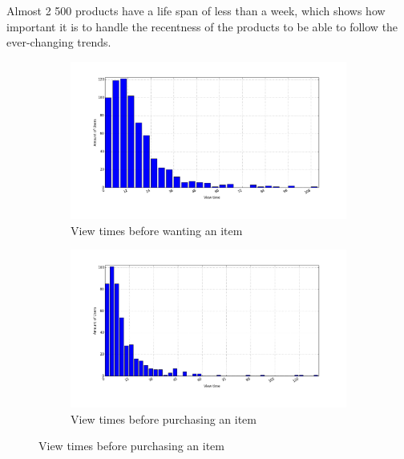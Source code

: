         Almost 2 500 products have a life span of less than a week, which shows how important it is to handle the recentness of the products to be able to follow the ever-changing trends.

    \begin{figure}[H]
        \centering
        \begin{subfigure}{.5\textwidth}
            \centering
            \includegraphics[width=\dualGraphWidth]{image/product_wanteddistribution.png}
            \caption{View times before wanting an item}
    \label{figure:viewWant}
        \end{subfigure}%
        \begin{subfigure}{.5\textwidth}
            \centering
            \includegraphics[width=\dualGraphWidth]{image/product_purchase_intendeddistribution.png}
            \caption{View times before purchasing an item}
    \label{figure:viewBuy}
        \end{subfigure}
    \end{figure}


